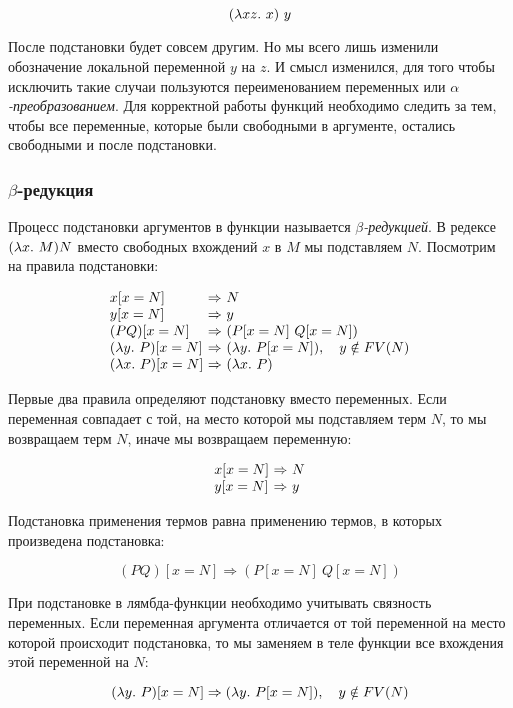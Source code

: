 \[(\lambda x z .\  x)\ y\]

После подстановки будет совсем другим. Но мы всего лишь изменили
обозначение локальной переменной $y$ на $z$. И смысл изменился, для того
чтобы исключить такие случаи пользуются переименованием переменных или
\emph{$\alpha$-преобразованием}. Для корректной работы функций
необходимо следить за тем, чтобы все переменные, которые были свободными
в аргументе, остались свободными и после подстановки.

\subsubsection{$\beta$-редукция}

Процесс подстановки аргументов в функции называется
\emph{$\beta$-редукцией}. В редексе $(\lambda x .\  M) N$ вместо
свободных вхождений $x$ в $M$ мы подставляем $N$. Посмотрим на правила
подстановки:

\[\begin{array}{l@{\ \RA\ }l}
x[x=N] & N \\
y[x=N] & y \\
(PQ)[x=N]   & (P[x=N]\ Q[x=N]) \\
(\lambda y \D P)[x = N] & (\lambda y \D P[x=N]), \quad y \notin FV(N)    \\ 
(\lambda x \D P)[x = N] & (\lambda x \D P)   \\
\end{array}\]

Первые два правила определяют подстановку вместо переменных. Если
переменная совпадает с той, на место которой мы подставляем терм $N$, то
мы возвращаем терм $N$, иначе мы возвращаем переменную:

\[\begin{array}{l@{\ \RA\ }l}
x[x=N] & N \\
y[x=N] & y \\
\end{array}\]

Подстановка применения термов равна применению термов, в которых
произведена подстановка:

\[(PQ)[x=N] \Rightarrow (P[x=N]\ Q[x=N])\]

При подстановке в лямбда-функции необходимо учитывать связность
переменных. Если переменная аргумента отличается от той переменной на
место которой происходит подстановка, то мы заменяем в теле функции все
вхождения этой переменной на $N$:

\[(\lambda y .\  P)[x = N] \Rightarrow (\lambda y .\  P[x=N]), \quad y \notin FV(N)\]

